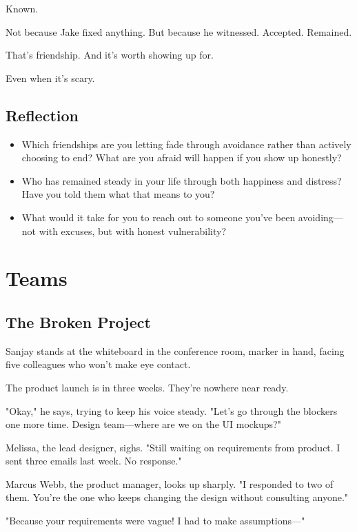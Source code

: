 \documentclass[11pt,twoside]{book}
\begin{document}
Known.

Not because Jake fixed anything. But because he witnessed. Accepted. Remained.

That's friendship. And it's worth showing up for.

Even when it's scary.

\section*{Reflection}

\begin{itemize}
\item Which friendships are you letting fade through avoidance rather than actively choosing to end? What are you afraid will happen if you show up honestly?
\item Who has remained steady in your life through both happiness and distress? Have you told them what that means to you?
\item What would it take for you to reach out to someone you've been avoiding—not with excuses, but with honest vulnerability?
\end{itemize}

\chapter{Teams}

\section*{The Broken Project}

Sanjay stands at the whiteboard in the conference room, marker in hand, facing five colleagues who won't make eye contact.

The product launch is in three weeks. They're nowhere near ready.

"Okay," he says, trying to keep his voice steady. "Let's go through the blockers one more time. Design team—where are we on the UI mockups?"

Melissa, the lead designer, sighs. "Still waiting on requirements from product. I sent three emails last week. No response."

Marcus Webb, the product manager, looks up sharply. "I responded to two of them. You're the one who keeps changing the design without consulting anyone."

"Because your requirements were vague! I had to make assumptions—"
\end{document}
